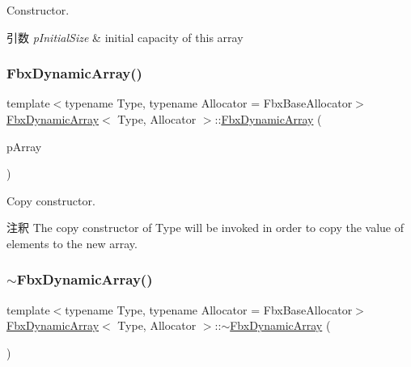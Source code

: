 Constructor. 
\begin{DoxyParams}{引数}
{\em p\+Initial\+Size} & initial capacity of this array \\
\hline
\end{DoxyParams}
\mbox{\label{class_fbx_dynamic_array_aa68b84abe44c5dce24e2aa53ae267698}} 
\subsubsection{\texorpdfstring{Fbx\+Dynamic\+Array()}{FbxDynamicArray()}\hspace{0.1cm}{\footnotesize\ttfamily [3/3]}}
{\footnotesize\ttfamily template$<$typename Type, typename Allocator = Fbx\+Base\+Allocator$>$ \\
\hyperlink{class_fbx_dynamic_array}{Fbx\+Dynamic\+Array}$<$ Type, Allocator $>$\+::\hyperlink{class_fbx_dynamic_array}{Fbx\+Dynamic\+Array} (\begin{DoxyParamCaption}\item[{const \hyperlink{class_fbx_dynamic_array}{Fbx\+Dynamic\+Array}$<$ Type, Allocator $>$ \&}]{p\+Array }\end{DoxyParamCaption})}

Copy constructor. \begin{DoxyRemark}{注釈}
The copy constructor of {\ttfamily Type} will be invoked in order to copy the value of elements to the new array. 
\end{DoxyRemark}
\mbox{\label{class_fbx_dynamic_array_a4e03e546be9c13e36cff068e0243fa92}} 
\subsubsection{\texorpdfstring{$\sim$\+Fbx\+Dynamic\+Array()}{~FbxDynamicArray()}}
{\footnotesize\ttfamily template$<$typename Type, typename Allocator = Fbx\+Base\+Allocator$>$ \\
\hyperlink{class_fbx_dynamic_array}{Fbx\+Dynamic\+Array}$<$ Type, Allocator $>$\+::$\sim$\hyperlink{class_fbx_dynamic_array}{Fbx\+Dynamic\+Array} (\begin{DoxyParamCaption}{ }\end{DoxyParamCaption})}



